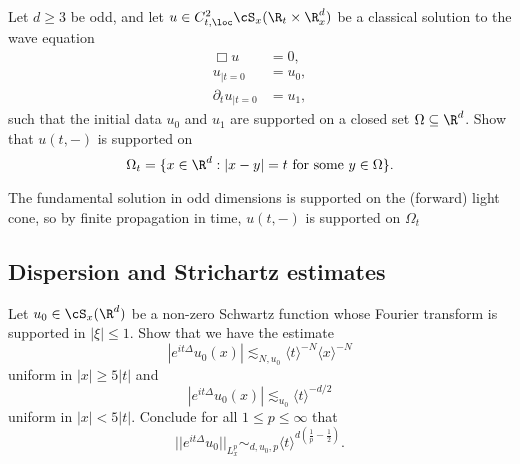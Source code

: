 \begin{solution}

		
\end{solution}

\begin{statement}
	Let $d \geq 3$ be odd, and let $u \in C^2_{t, \loc} \cS_x (\R_t \times \R^d_x)$ be a classical solution to the wave equation
		\begin{align*}
			\Box u 							&= 0,\\
			u_{|t = 0}						&= u_0, \\
			\partial_t u_{|t= 0}	&= u_1,
		\end{align*}	
	such that the initial data $u_0$ and $u_1$ are supported on a closed set $\Omega \subseteq \R^d$. Show that $u(t, - )$ is supported on
		\[ \Omega_t = \{ x \in \R^d : |x - y| = t \text{ for some } y \in \Omega \}. \]
\end{statement}

\begin{solution}
	The fundamental solution in odd dimensions is supported on the (forward) light cone, so by finite propagation in time, $u(t, -)$ is supported on $\Omega_t$ 	
\end{solution}

\subsection{Dispersion and Strichartz estimates}

\begin{statement}
	Let $u_0 \in \cS_x (\R^d)$ be a non-zero Schwartz function whose Fourier transform is supported in $|\xi| \leq 1$. Show that we have the estimate 
		\[ |e^{i t \Delta} u_0 (x)| \lesssim_{N, u_0} \langle t \rangle^{-N} \langle x \rangle^{-N} \]
	uniform in $|x| \geq 5|t|$ and 
		\[ |e^{it \Delta} u_0 (x)|\lesssim_{u_0} \langle t \rangle^{-d/2} \]
	uniform in $|x| < 5|t|$. Conclude for all $1 \leq p \leq \infty$ that 
		\[ ||e^{it \Delta} u_0 ||_{L^p_x} \sim_{d, u_0, p} \langle t \rangle^{d(\frac1p - \frac12)}.  \]
\end{statement}

